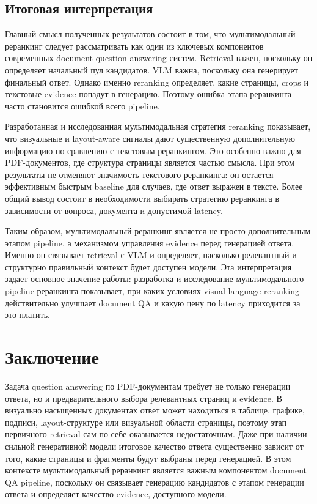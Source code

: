 \documentclass[conference]{IEEEtran}
\begin{document}
\subsection{Итоговая интерпретация}

Главный смысл полученных результатов состоит в том, что мультимодальный реранкинг следует рассматривать как один из ключевых компонентов современных document question answering систем. Retrieval важен, поскольку он определяет начальный пул кандидатов. VLM важна, поскольку она генерирует финальный ответ. Однако именно reranking определяет, какие страницы, crops и текстовые evidence попадут в генерацию. Поэтому ошибка этапа реранкинга часто становится ошибкой всего pipeline.

Разработанная и исследованная мультимодальная стратегия reranking показывает, что визуальные и layout-aware сигналы дают существенную дополнительную информацию по сравнению с текстовым реранкингом. Это особенно важно для PDF-документов, где структура страницы является частью смысла. При этом результаты не отменяют значимость текстового реранкинга: он остается эффективным быстрым baseline для случаев, где ответ выражен в тексте. Более общий вывод состоит в необходимости выбирать стратегию реранкинга в зависимости от вопроса, документа и допустимой latency.

Таким образом, мультимодальный реранкинг является не просто дополнительным этапом pipeline, а механизмом управления evidence перед генерацией ответа. Именно он связывает retrieval с VLM и определяет, насколько релевантный и структурно правильный контекст будет доступен модели. Эта интерпретация задает основное значение работы: разработка и исследование мультимодального pipeline реранкинга показывает, при каких условиях visual-language reranking действительно улучшает document QA и какую цену по latency приходится за это платить.


\section{Заключение}

Задача question answering по PDF-документам требует не только генерации ответа, но и предварительного выбора релевантных страниц и evidence. В визуально насыщенных документах ответ может находиться в таблице, графике, подписи, layout-структуре или визуальной области страницы, поэтому этап первичного retrieval сам по себе оказывается недостаточным. Даже при наличии сильной генеративной модели итоговое качество ответа существенно зависит от того, какие страницы и фрагменты будут выбраны перед генерацией. В этом контексте мультимодальный реранкинг является важным компонентом document QA pipeline, поскольку он связывает генерацию кандидатов с этапом генерации ответа и определяет качество evidence, доступного модели.
\end{document}
